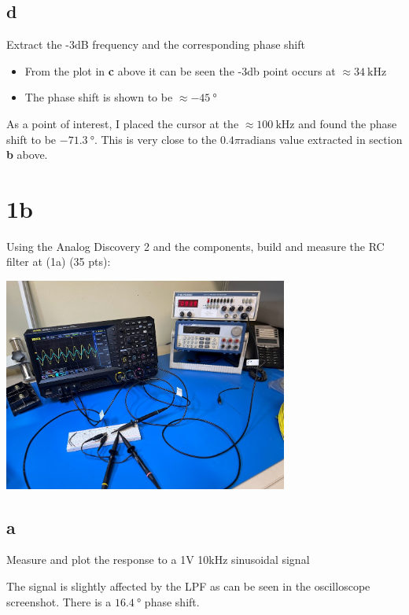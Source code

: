 \documentclass{article}
\begin{document}
	\subsection*{d}
	
	Extract the -3dB frequency and the corresponding phase shift

	\begin{itemize}
		\item From the plot in \textbf{c} above it can be seen the -3db point occurs at $\approx \SI{34}{\kilo\hertz}$
		\item The phase shift is shown to be $\approx \SI{-45}{\degree}$
	\end{itemize}
	
	As a point of interest, I placed the cursor at the $\approx \SI{100}{\kilo\hertz}$ and found the phase shift to be $\SI{-71.3}{\degree}$. This is very close to the $0.4\pi \text{radians}$ value extracted in section \textbf{b} above.
	
	\section*{1b}
	
	Using the Analog Discovery 2 and the components, build and measure the RC filter at (1a) (35 pts):

	
	\begin{center}
	\includegraphics[width=0.7\textwidth]{lpf-setup}
	\end{center}

	\subsection*{a}
	
	Measure and plot the response to a 1V 10kHz sinusoidal signal
	
	The signal is slightly affected by the LPF as can be seen in the oscilloscope screenshot. There is a $\SI{16.4}{\degree}$ phase shift.
\end{document}
